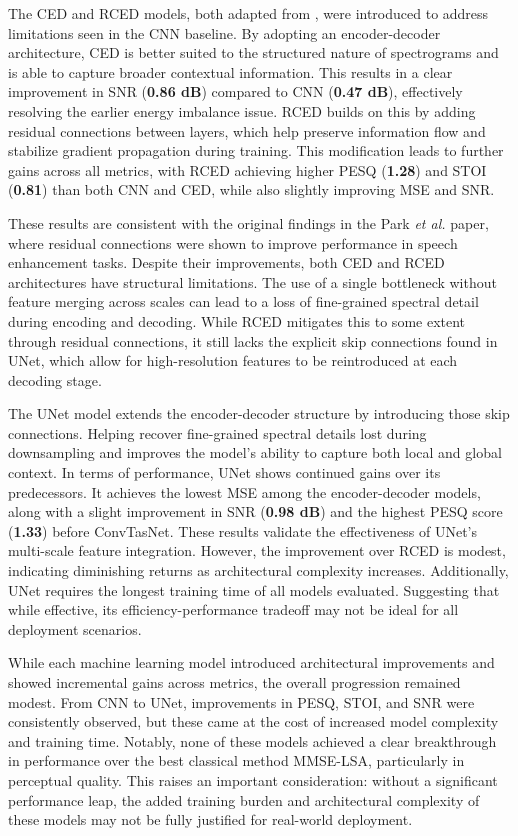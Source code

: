 The CED and RCED models, both adapted from \cite{park2017acoustic}, were introduced to address limitations seen in the CNN baseline. By adopting an encoder-decoder architecture, CED is better suited to the structured nature of spectrograms and is able to capture broader contextual information. This results in a clear improvement in SNR (\textbf{0.86 dB}) compared to CNN (\textbf{0.47 dB}), effectively resolving the earlier energy imbalance issue. RCED builds on this by adding residual connections between layers, which help preserve information flow and stabilize gradient propagation during training. This modification leads to further gains across all metrics, with RCED achieving higher PESQ (\textbf{1.28}) and STOI (\textbf{0.81}) than both CNN and CED, while also slightly improving MSE and SNR.

These results are consistent with the original findings in the Park \textit{et al.} paper, where residual connections were shown to improve performance in speech enhancement tasks. Despite their improvements, both CED and RCED architectures have structural limitations. The use of a single bottleneck without feature merging across scales can lead to a loss of fine-grained spectral detail during encoding and decoding. While RCED mitigates this to some extent through residual connections, it still lacks the explicit skip connections found in UNet, which allow for high-resolution features to be reintroduced at each decoding stage. 

The UNet model extends the encoder-decoder structure by introducing those skip connections. Helping recover fine-grained spectral details lost during downsampling and improves the model’s ability to capture both local and global context. In terms of performance, UNet shows continued gains over its predecessors. It achieves the lowest MSE among the encoder-decoder models, along with a slight improvement in SNR (\textbf{0.98 dB}) and the highest PESQ score (\textbf{1.33}) before ConvTasNet. These results validate the effectiveness of UNet’s multi-scale feature integration. However, the improvement over RCED is modest, indicating diminishing returns as architectural complexity increases. Additionally, UNet requires the longest training time of all models evaluated. Suggesting that while effective, its efficiency-performance tradeoff may not be ideal for all deployment scenarios.

While each machine learning model introduced architectural improvements and showed incremental gains across metrics, the overall progression remained modest. From CNN to UNet, improvements in PESQ, STOI, and SNR were consistently observed, but these came at the cost of increased model complexity and training time. Notably, none of these models achieved a clear breakthrough in performance over the best classical method MMSE-LSA, particularly in perceptual quality. This raises an important consideration: without a significant performance leap, the added training burden and architectural complexity of these models may not be fully justified for real-world deployment.

